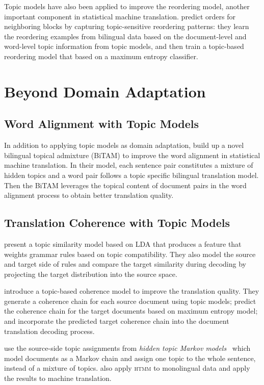 Topic models have also been applied to improve the reordering model, another important component in statistical machine translation.
\citet{wang-14} predict orders for neighboring blocks by capturing topic-sensitive reordering patterns: they learn the reordering examples from bilingual data based on the document-level and word-level topic information from topic models, and then train a topic-based reordering model that based on a maximum entropy classifier. 

\section{Beyond Domain Adaptation}

\subsection{Word Alignment with Topic Models}

In addition to applying topic models as domain adaptation, \citet{zhao-06} build up a novel bilingual topical admixture (BiTAM) to improve the word alignment in statistical machine translation. In their model, each sentence pair constitutes a mixture of hidden topics and a word pair follows a topic specific bilingual translation model. Then the BiTAM leverages the topical content of document pairs in the word alignment process to obtain better translation quality.

\subsection{Translation Coherence with Topic Models}

\citet{xiao-12} present a topic similarity model based on LDA that produces a feature that weights grammar rules based on topic compatibility. They also model the source and target side of rules and compare the target similarity during decoding by projecting the target distribution into the source space.

\citet{xiong-13} introduce a topic-based coherence model to improve the translation quality. They generate a coherence chain for each source document using topic models; predict the coherence chain for the target documents based on maximum entropy model; and incorporate the predicted target coherence chain into the document translation decoding process.

\citet{hasler-12} use the source-side topic assignments from \emph{hidden topic Markov models}~\citep[\textsc{htmm}]{gruber-07} which model documents as a Markov chain and assign one topic to the whole sentence, instead of a mixture of topics.  \citet{su-12} also apply \textsc{htmm} to monolingual data and apply the results to machine translation.

